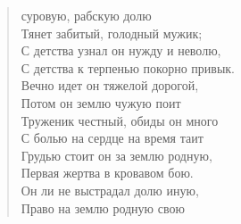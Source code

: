 \newpage
\vspace*{0cm}


\begin{verse}
\begin{patverse}
 суровую, рабскую долю\\
Тянет забитый, голодный мужик;\\
С детства узнал он нужду и неволю,\\
С детства к терпенью покорно привык.\\
Вечно идет он тяжелой дорогой,\\
Потом он землю чужую поит\ldotst\\
Труженик честный, обиды он много\\
С болью на сердце на время таит\ldotst\\
Грудью стоит он за землю родную, \\
Первая жертва в кровавом бою.\\
Он ли не выстрадал долю иную,\\
Право на землю родную свою\ldotsq
\end{patverse}
\end{verse}

\newpage
\vspace*{2cm}
 
